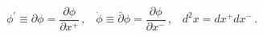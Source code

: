 \begin{equation*}
\phi ^{\prime }\equiv \partial \phi =\frac{\partial \phi }{\partial x^{+}}%
\,,\;\;\;\dot{\phi}\equiv \bar{\partial}\phi =\frac{\partial \phi }{\partial
x^{-}}\,,\;\;\;d^{2}x=dx^{+}dx^{-}\,.
\end{equation*}

